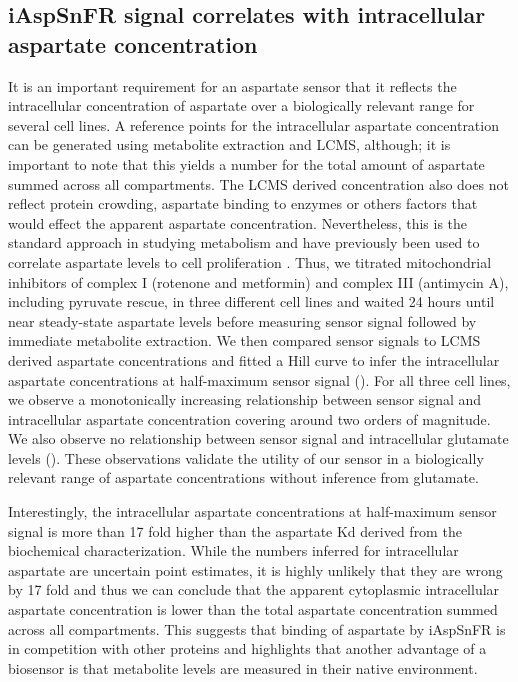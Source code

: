 \documentclass[9pt,lineno]{elife}
\begin{document}
\subsection{iAspSnFR signal correlates with intracellular aspartate concentration}
It is an important requirement for an aspartate sensor that it reflects the intracellular concentration of aspartate over a biologically relevant range for several cell lines.
A reference points for the intracellular aspartate concentration can be generated using metabolite extraction and LCMS, although; it is important to note that this yields a number for the total amount of aspartate summed across all compartments.
The LCMS derived concentration also does not reflect protein crowding, aspartate binding to enzymes or others factors that would effect the apparent aspartate concentration.
Nevertheless, this is the standard approach in studying metabolism and have previously been used to correlate aspartate levels to cell proliferation \citep{Gui2016-ca}.
Thus, we titrated mitochondrial inhibitors of complex I (rotenone and metformin) and complex III (antimycin A), including pyruvate rescue, in three different cell lines and waited 24 hours until near steady-state aspartate levels before measuring sensor signal followed by immediate metabolite extraction.
We then compared sensor signals to LCMS derived aspartate concentrations and fitted a Hill curve to infer the intracellular aspartate concentrations at half-maximum sensor signal ().
For all three cell lines, we observe a monotonically increasing relationship between sensor signal and intracellular aspartate concentration covering around two orders of magnitude.
We also observe no relationship between sensor signal and intracellular glutamate levels ().
These observations validate the utility of our sensor in a biologically relevant range of aspartate concentrations without inference from glutamate.

Interestingly, the intracellular aspartate concentrations at half-maximum sensor signal is more than 17 fold higher than the aspartate Kd derived from the biochemical characterization.
While the numbers inferred for intracellular aspartate are uncertain point estimates, it is highly unlikely that they are wrong by 17 fold and thus we can conclude that the apparent cytoplasmic intracellular aspartate concentration is lower than the total aspartate concentration summed across all compartments.
This suggests that binding of aspartate by iAspSnFR is in competition with other proteins and highlights that another advantage of a biosensor is that metabolite levels are measured in their native environment.
\end{document}
